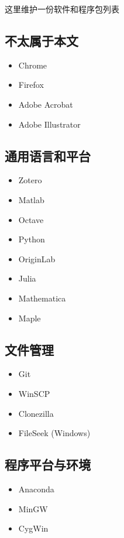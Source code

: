 
这里维护一份软件和程序包列表

\subsection{不太属于本文}
\begin{itemize}
\item Chrome
\item Firefox
\item Adobe Acrobat
\item Adobe Illustrator
\end{itemize}

\subsection{通用语言和平台}
\begin{itemize}
\item Zotero
\item Matlab
\item Octave
\item Python
\item OriginLab
\item Julia
\item Mathematica
\item Maple
\end{itemize}

\subsection{文件管理}
\begin{itemize}
\item Git
\item WinSCP
\item Clonezilla
\item FileSeek (Windows)
\end{itemize}

\subsection{程序平台与环境}
\begin{itemize}
\item Anaconda
\item MinGW
\item CygWin
\end{itemize}

